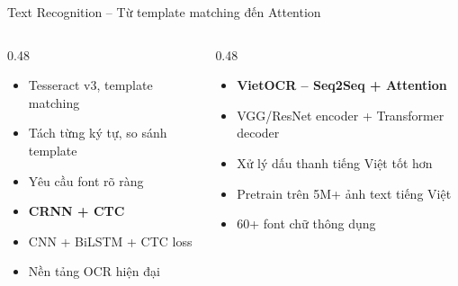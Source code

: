 \documentclass[aspectratio=169, 10pt]{beamer}
\begin{document}
\begin{frame}{Text Recognition -- Từ template matching đến Attention}
 \begin{columns}[T]
 \begin{column}{0.48\textwidth}
 \begin{tcolorbox}[colback=gray!8, colframe=graytext, title={Thế hệ 1 (trước 2014)}, fonttitle=\bfseries, rounded corners, boxrule=0.5pt]
 \begin{itemize}
 \item Tesseract v3, template matching
 \item Tách từng ký tự, so sánh template
 \item Yêu cầu font rõ ràng
 \end{itemize}
 \end{tcolorbox}
 \vspace{0.2cm}
 \begin{tcolorbox}[colback=orange!8, colframe=warning, title={Thế hệ 2 (2015--2018)}, fonttitle=\bfseries, rounded corners, boxrule=0.5pt]
 \begin{itemize}
 \item \textbf{CRNN + CTC}
 \item CNN + BiLSTM + CTC loss
 \item Nền tảng OCR hiện đại
 \end{itemize}
 \end{tcolorbox}
 \end{column}
 \begin{column}{0.48\textwidth}
 \begin{tcolorbox}[colback=accentlight, colframe=accent, title={Thế hệ 3 (2018--nay)}, fonttitle=\bfseries, rounded corners, boxrule=0.8pt]
 \begin{itemize}
 \item \textbf{VietOCR -- Seq2Seq + Attention}
 \item VGG/ResNet encoder + Transformer decoder
 \item Xử lý dấu thanh tiếng Việt tốt hơn
 \item Pretrain trên 5M+ ảnh text tiếng Việt
 \item 60+ font chữ thông dụng
 \end{itemize}
 \end{tcolorbox}
 \end{column}
 \end{columns}
\end{frame}
\end{document}
